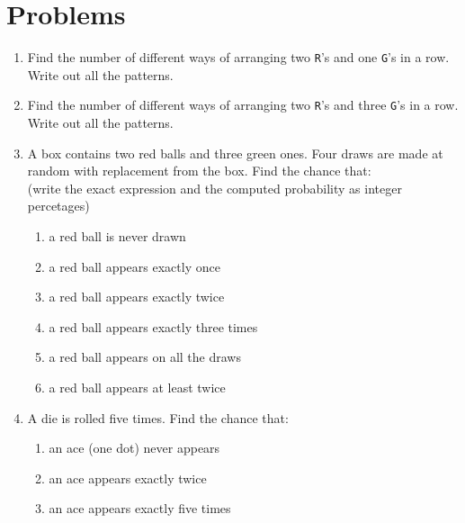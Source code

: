 \documentclass[12pt, oneside]{article}
\begin{document}
\section{Problems}
\begin{enumerate}

\item Find the number of different ways of arranging two {\tt R}'s and
  one {\tt G}'s in a row. Write out all the patterns.
\item Find the number of different ways of arranging two {\tt R}'s and
  three {\tt G}'s in a row. Write out all the patterns.
\item A box contains two red balls and three green ones. Four draws
  are made at random with replacement from the box. Find the chance
  that:\\
  (write the exact expression and the computed probability as
  integer percetages)
\begin{enumerate}
    \item a red ball is never drawn
    \item a red ball appears exactly once
    \item a red ball appears exactly twice
    \item a red ball appears exactly three times
    \item a red ball appears on all the draws
    \item a red ball appears at least twice
\end{enumerate}
\item A die is rolled five times. Find the chance that:
\begin{enumerate}
    \item an ace (one dot) never appears
    \item an ace appears exactly twice
    \item an ace appears exactly five times
\end{enumerate}

\end{enumerate}
\end{document}

